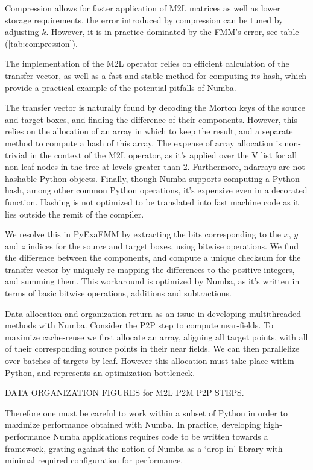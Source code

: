 \documentclass{IEEEcsmag}
\begin{document}
Compression allows for faster application of M2L matrices as well as lower storage requirements, the error introduced by compression can be tuned by adjusting $k$. However, it is in practice dominated by the FMM's error, see table (\ref{tab:compression}).

The implementation of the M2L operator relies on efficient calculation of the transfer vector, as well as a fast and stable method for computing its hash, which provide a practical example of the potential pitfalls of Numba.

The transfer vector is naturally found by decoding the Morton keys of the source and target boxes, and finding the difference of their components. However, this relies on the allocation of an array in which to keep the result, and a separate method to compute a hash of this array. The expense of array allocation is non-trivial in the context of the M2L operator, as it's applied over the V list for all non-leaf nodes in the tree at levels greater than 2. Furthermore, ndarrays are not hashable Python objects. Finally, though Numba supports computing a Python hash, among other common Python operations, it's expensive even in a decorated function. Hashing is not optimized to be translated into fast machine code as it lies outside the remit of the compiler.

We resolve this in PyExaFMM by extracting the bits corresponding to the $x$, $y$ and $z$ indices for the source and target boxes, using bitwise operations. We find the difference between the components, and compute a unique checksum for the transfer vector by uniquely re-mapping the differences to the positive integers, and summing them. This workaround is optimized by Numba, as it's written in terms of basic bitwise operations, additions and subtractions.

Data allocation and organization return as an issue in developing multithreaded methods with Numba. Consider the P2P step to compute near-fields. To maximize cache-reuse we first allocate an array, aligning all target points, with all of their corresponding source points in their near fields. We can then parallelize over batches of targets by leaf. However this allocation must take place within Python, and represents an optimization bottleneck.

DATA ORGANIZATION FIGURES for M2L P2M P2P STEPS.

Therefore one must be careful to work within a subset of Python in order to maximize performance obtained with Numba. In practice, developing high-performance Numba applications requires code to be written towards a framework, grating against the notion of Numba as a `drop-in' library with minimal required configuration for performance.
\end{document}
